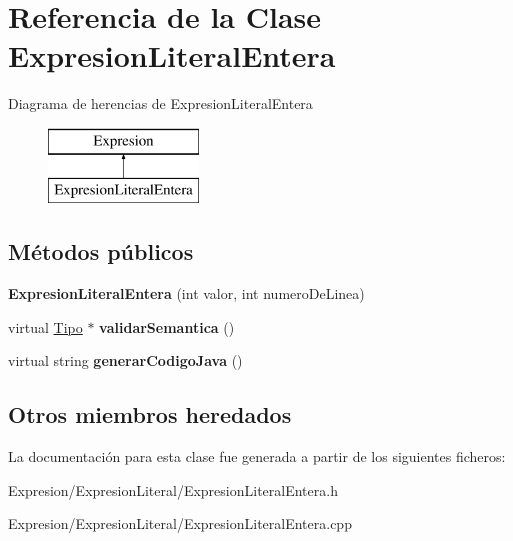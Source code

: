 \hypertarget{class_expresion_literal_entera}{\section{Referencia de la Clase Expresion\-Literal\-Entera}
\label{class_expresion_literal_entera}
}
Diagrama de herencias de Expresion\-Literal\-Entera\begin{figure}[H]
\begin{center}
\leavevmode
\includegraphics[height=2.000000cm]{class_expresion_literal_entera}
\end{center}
\end{figure}
\subsection*{Métodos públicos}
\begin{DoxyCompactItemize}
\item 
\hypertarget{class_expresion_literal_entera_af9fbcbcf1980e9b88d336ec8341a5b5f}{{\bfseries Expresion\-Literal\-Entera} (int valor, int numero\-De\-Linea)}\label{class_expresion_literal_entera_af9fbcbcf1980e9b88d336ec8341a5b5f}

\item 
\hypertarget{class_expresion_literal_entera_ae70eb9a5ae257722518571e8b588b784}{virtual \hyperlink{class_tipo}{Tipo} $\ast$ {\bfseries validar\-Semantica} ()}\label{class_expresion_literal_entera_ae70eb9a5ae257722518571e8b588b784}

\item 
\hypertarget{class_expresion_literal_entera_a3805de0b11acedef3cdac86730f4eadc}{virtual string {\bfseries generar\-Codigo\-Java} ()}\label{class_expresion_literal_entera_a3805de0b11acedef3cdac86730f4eadc}

\end{DoxyCompactItemize}
\subsection*{Otros miembros heredados}


La documentación para esta clase fue generada a partir de los siguientes ficheros\-:\begin{DoxyCompactItemize}
\item 
Expresion/\-Expresion\-Literal/Expresion\-Literal\-Entera.\-h\item 
Expresion/\-Expresion\-Literal/Expresion\-Literal\-Entera.\-cpp\end{DoxyCompactItemize}
